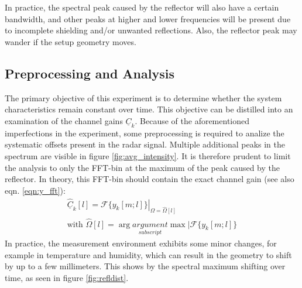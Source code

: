 In practice, the spectral peak caused by the reflector will also have a certain bandwidth,
and other peaks at higher and lower frequencies will be present due to incomplete shielding and/or unwanted reflections.
Also, the reflector peak may wander if the setup geometry moves.

\subsection{Preprocessing and Analysis}
The primary objective of this experiment is to determine whether the system characteristics remain constant over time. 
This objective can be distilled into an examination of the channel gains $\underline C_k$.
Because of the aforementioned imperfections in the experiment, some preprocessing is required to analize the systematic offsets present in the radar signal.
Multiple additional peaks in the spectrum are visible in figure \ref{fig:avg_intensity}.
It is therefore prudent to limit the analysis to only the FFT-bin at the maximum of the peak caused by the reflector.
In theory, this FFT-bin should contain the exact channel gain (see also eqn. \ref{eqn:y_fft}):
\begin{align}
    \hat{\underline{C}}_k[l] = \left.\mathcal{F}\{ y_k[m;l]\}\right|_{\Omega=\hat \Omega[l]} \\
    \text{with } \hat\Omega[l] = \arg \underset{subscript}{argument}\max |\mathcal{F}\{ y_k[m;l]\}
\end{align}
In practice, the measurement environment exhibits some minor changes, for example in temperature and humidity, 
which can result in the geometry to shift by up to a few millimeters.
This shows by the spectral maximum shifting over time, as seen in figure \ref{fig:refldist}.
